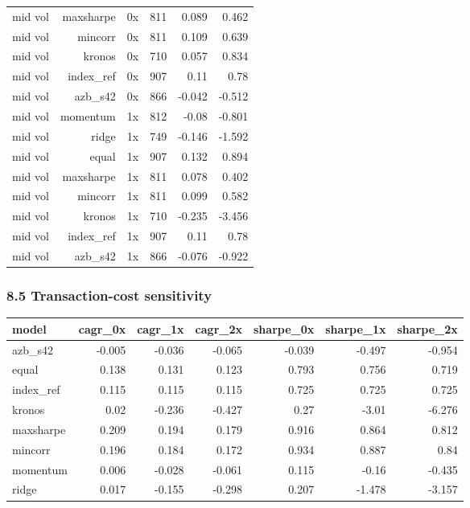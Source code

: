 \begin{center}
\begin{longtable}{lrrrrr}
mid vol & maxsharpe & 0x & 811 & 0.089 & 0.462 \\
mid vol & mincorr & 0x & 811 & 0.109 & 0.639 \\
mid vol & kronos & 0x & 710 & 0.057 & 0.834 \\
mid vol & index\_ref & 0x & 907 & 0.11 & 0.78 \\
mid vol & azb\_s42 & 0x & 866 & -0.042 & -0.512 \\
mid vol & momentum & 1x & 812 & -0.08 & -0.801 \\
mid vol & ridge & 1x & 749 & -0.146 & -1.592 \\
mid vol & equal & 1x & 907 & 0.132 & 0.894 \\
mid vol & maxsharpe & 1x & 811 & 0.078 & 0.402 \\
mid vol & mincorr & 1x & 811 & 0.099 & 0.582 \\
mid vol & kronos & 1x & 710 & -0.235 & -3.456 \\
mid vol & index\_ref & 1x & 907 & 0.11 & 0.78 \\
mid vol & azb\_s42 & 1x & 866 & -0.076 & -0.922 \\
\bottomrule
\end{longtable}\end{center}

\subsubsection*{8.5 Transaction-cost sensitivity}

\begin{center}\footnotesize\begin{longtable}{lrrrrrr}
\toprule
model & cagr\_0x & cagr\_1x & cagr\_2x & sharpe\_0x & sharpe\_1x & sharpe\_2x \\
\midrule
azb\_s42 & -0.005 & -0.036 & -0.065 & -0.039 & -0.497 & -0.954 \\
equal & 0.138 & 0.131 & 0.123 & 0.793 & 0.756 & 0.719 \\
index\_ref & 0.115 & 0.115 & 0.115 & 0.725 & 0.725 & 0.725 \\
kronos & 0.02 & -0.236 & -0.427 & 0.27 & -3.01 & -6.276 \\
maxsharpe & 0.209 & 0.194 & 0.179 & 0.916 & 0.864 & 0.812 \\
mincorr & 0.196 & 0.184 & 0.172 & 0.934 & 0.887 & 0.84 \\
momentum & 0.006 & -0.028 & -0.061 & 0.115 & -0.16 & -0.435 \\
ridge & 0.017 & -0.155 & -0.298 & 0.207 & -1.478 & -3.157 \\
\bottomrule
\end{longtable}\end{center}

